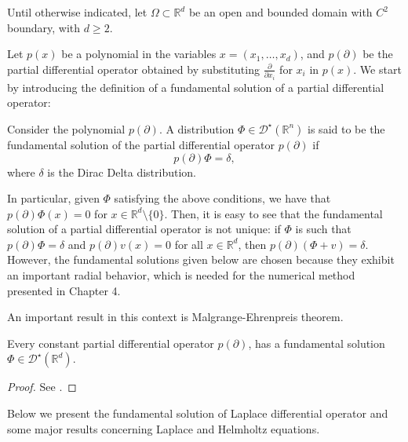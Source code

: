 \label{chap:problem_introduction}

Until otherwise indicated, let \(\Omega \subset \mathbb{R}^d\) be an open and bounded domain with \(C^2\) boundary, with $d \geq 2$.

Let \(p(x)\) be a polynomial in the variables \(x=(x_1,\dots,x_d)\), and \(p(\partial)\) be the partial differential operator obtained by substituting \(\frac{\partial}{\partial x_i}\) for \(x_i\) in \(p(x)\). We start by introducing the definition of a fundamental solution of a partial differential operator:

\begin{definition}
    Consider the polynomial \(p(\partial)\). A distribution \(\Phi \in \mathcal{D}^\star(\mathbb{R}^n)\) is said to be the fundamental solution of the partial differential operator \(p(\partial)\) if
    \[
        p(\partial) \Phi = \delta,
    \]
    where \(\delta\) is the Dirac Delta distribution.
\end{definition}

In particular, given \(\Phi\) satisfying the above conditions, we have that \(p(\partial)\Phi(x) = 0\) for \(x \in \mathbb{R}^d\setminus \{0\}\). Then, it is easy to see that the fundamental solution of a partial differential operator is not unique: if \(\Phi\) is such that \(p(\partial) \Phi = \delta\) and \(p(\partial) v(x) = 0\) for all \(x \in \mathbb{R}^d\), then \(p(\partial) (\Phi + v) = \delta\). However, the fundamental solutions given below are chosen because they exhibit an important radial behavior, which is needed for the numerical method presented in Chapter 4.

An important result in this context is Malgrange-Ehrenpreis theorem.

\begin{theorem}\label{malgrange-ehrenpreis}
    Every constant partial differential operator $p(\partial)$, has a fundamental solution $\Phi \in \mathcal{D}^\star(\mathbb{R}^d)$.
\end{theorem}
\begin{proof}
    See \cite{reed1975ii}.
\end{proof}
Below we present the fundamental solution of Laplace differential operator and some major results concerning Laplace and Helmholtz equations. 


